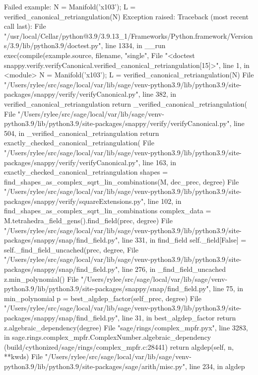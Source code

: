 Failed example:
    N = Manifold('x103'); L = verified_canonical_retriangulation(N)
Exception raised:
    Traceback (most recent call last):
      File "/usr/local/Cellar/python@3.9/3.9.13_1/Frameworks/Python.framework/Versions/3.9/lib/python3.9/doctest.py", line 1334, in __run
        exec(compile(example.source, filename, "single",
      File "<doctest snappy.verify.verifyCanonical.verified_canonical_retriangulation[15]>", line 1, in <module>
        N = Manifold('x103'); L = verified_canonical_retriangulation(N)
      File "/Users/rylee/src/sage/local/var/lib/sage/venv-python3.9/lib/python3.9/site-packages/snappy/verify/verifyCanonical.py", line 382, in verified_canonical_retriangulation
        return _verified_canonical_retriangulation(
      File "/Users/rylee/src/sage/local/var/lib/sage/venv-python3.9/lib/python3.9/site-packages/snappy/verify/verifyCanonical.py", line 504, in _verified_canonical_retriangulation
        return exactly_checked_canonical_retriangulation(
      File "/Users/rylee/src/sage/local/var/lib/sage/venv-python3.9/lib/python3.9/site-packages/snappy/verify/verifyCanonical.py", line 163, in exactly_checked_canonical_retriangulation
        shapes = find_shapes_as_complex_sqrt_lin_combinations(M, dec_prec, degree)
      File "/Users/rylee/src/sage/local/var/lib/sage/venv-python3.9/lib/python3.9/site-packages/snappy/verify/squareExtensions.py", line 102, in find_shapes_as_complex_sqrt_lin_combinations
        complex_data = M.tetrahedra_field_gens().find_field(prec, degree)
      File "/Users/rylee/src/sage/local/var/lib/sage/venv-python3.9/lib/python3.9/site-packages/snappy/snap/find_field.py", line 331, in find_field
        self._field[False] = self._find_field_uncached(prec, degree,
      File "/Users/rylee/src/sage/local/var/lib/sage/venv-python3.9/lib/python3.9/site-packages/snappy/snap/find_field.py", line 276, in _find_field_uncached
        z.min_polynomial()
      File "/Users/rylee/src/sage/local/var/lib/sage/venv-python3.9/lib/python3.9/site-packages/snappy/snap/find_field.py", line 75, in min_polynomial
        p = best_algdep_factor(self_prec, degree)
      File "/Users/rylee/src/sage/local/var/lib/sage/venv-python3.9/lib/python3.9/site-packages/snappy/snap/find_field.py", line 31, in best_algdep_factor
        return z.algebraic_dependency(degree)
      File "sage/rings/complex_mpfr.pyx", line 3283, in sage.rings.complex_mpfr.ComplexNumber.algebraic_dependency (build/cythonized/sage/rings/complex_mpfr.c:28441)
        return algdep(self, n, **kwds)
      File "/Users/rylee/src/sage/local/var/lib/sage/venv-python3.9/lib/python3.9/site-packages/sage/arith/misc.py", line 234, in algdep
